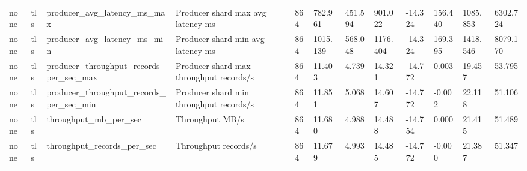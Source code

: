 \begin{longtable}{llllllllllll}
none & tls & producer\_avg\_latency\_ms\_max & Producer shard max avg latency ms & 864 & 782.961 & 451.594 & 901.022 & -14.324 & 156.440 & 1085.853 & 6302.724 \\
none & tls & producer\_avg\_latency\_ms\_min & Producer shard min avg latency ms & 864 & 1015.139 & 568.048 & 1176.404 & -14.324 & 169.395 & 1418.546 & 8079.170 \\
none & tls & producer\_throughput\_records\_per\_sec\_max & Producer shard max throughput records/s & 864 & 11.403 & 4.739 & 14.321 & -14.772 & 0.003 & 19.457 & 53.795 \\
none & tls & producer\_throughput\_records\_per\_sec\_min & Producer shard min throughput records/s & 864 & 11.851 & 5.068 & 14.607 & -14.772 & -0.002 & 22.118 & 51.106 \\
none & tls & throughput\_mb\_per\_sec & Throughput MB/s & 864 & 11.680 & 4.988 & 14.488 & -14.754 & 0.000 & 21.415 & 51.489 \\
none & tls & throughput\_records\_per\_sec & Throughput records/s & 864 & 11.679 & 4.993 & 14.485 & -14.772 & -0.000 & 21.387 & 51.347 \\
\hline
\end{longtable}
